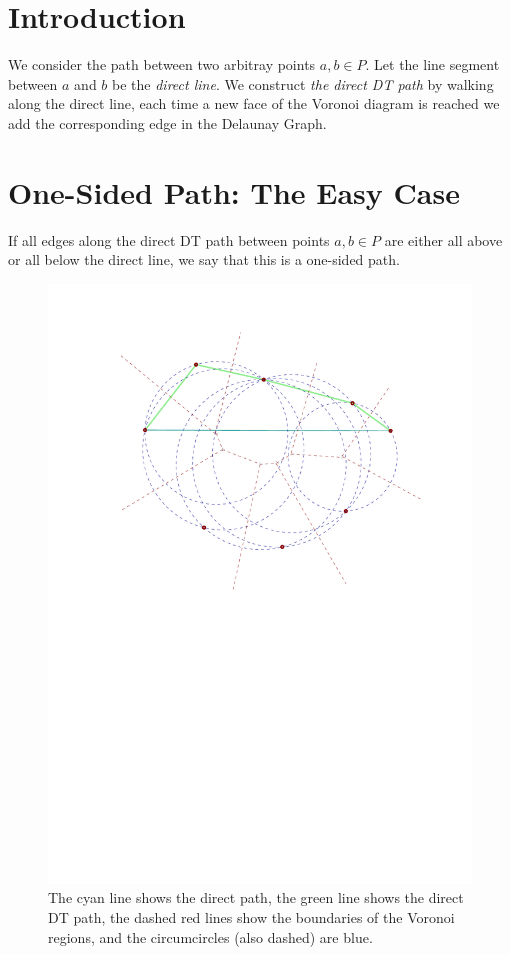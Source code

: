 \documentclass{tufte-handout}
\begin{document}
\section{Introduction}

We consider the path between two arbitray points $a,b \in P$.  Let the
line segment between $a$ and $b$ be the \emph{direct line}.  We
construct \emph{the direct DT path} by walking along the direct line,
each time a new face of the Voronoi diagram is reached we add the
corresponding edge in the Delaunay Graph.

\section{One-Sided Path: The Easy Case}

If all edges along the direct DT path between points $a,b \in P$ are
either all above or all below the direct line, we say that this is a
one-sided path.

\begin{figure}
  \includegraphics[scale=0.8]{figures/one-sided_path.pdf}
  \caption{The cyan line shows the direct path, the green line shows
    the direct DT path, the dashed red lines show the boundaries of
    the Voronoi regions, and the circumcircles (also dashed) are
    blue.}
\end{figure}
\end{document}
